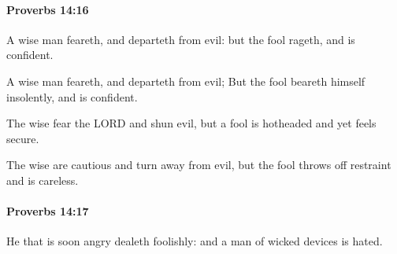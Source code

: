 		\paragraph{Proverbs 14:16} %
			\label{PROVERBS-14-16}

			A wise man feareth, and departeth from evil: but the fool rageth, and is confident.

			\begin{versebox}
					\item[BHS] 
					\item[ASV] A wise man feareth, and departeth from evil; But the fool beareth himself insolently, and is confident.
					\item[NIV] The wise fear the LORD and shun evil, but a fool is hotheaded and yet feels secure.
					\item[NRSV] The wise are cautious and turn away from evil, but the fool throws off restraint and is careless.
			\end{versebox}

		\paragraph{Proverbs 14:17} %
			\label{PROVERBS-14-17}

			He that is soon angry dealeth foolishly: and a man of wicked devices is hated.

